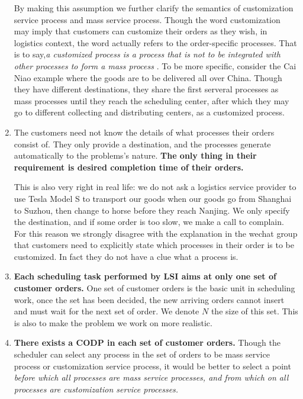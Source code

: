 \documentclass{llncs}
\begin{document}
\begin{enumerate}
    By making this assumption we further clarify the semantics of customization service process and mass service process. Though the word customization may imply that customers can customize their orders as they wish, in logistics context, the word actually refers to the order-specific processes. That is to say,\emph{a customized process is a process that is not to be integrated with other processes to form a mass process} . To be more specific, consider the Cai Niao example where the goods are to be delivered all over China. Though they have different destinations, they share the first serveral processes as mass processes until they reach the scheduling center, after which they may go to different collecting and distributing centers, as a customized process.
    \item The customers need not know the details of what processes their orders consist of. They only provide a destination, and the processes generate automatically to the problems's nature. \textbf{The only thing in their requirement is desired completion time of their orders.} 
    
    This is also very right in real life: we do not ask a logistics service provider to use Tesla Model S to transport our goods when our goods go from Shanghai to Suzhou, then change to horse before they reach Nanjing. We only specify the destination, and if some order is too slow, we make a call to complain. For this reason we strongly disagree with the explanation in the wechat group that customers need to explicitly state which processes in their order is to be customized. In fact they do not have a clue what a process is.
    \item \textbf{Each scheduling task performed by LSI aims at only one set of customer orders.} One set of customer orders is the basic unit in scheduling work, once the set has been decided, the new arriving orders cannot insert and must wait for the next set of order. We denote $N$ the size of this set. This is also to make the problem we work on more realistic. 
    \item \textbf{There exists a CODP in each set of customer orders.} Though the scheduler can select any process in the set of orders to be mass service process or customization service process, it would be better to select a point \emph{before which all processes are mass service processes, and from which on all processes are customization service processes.}
    

\end{enumerate}
\end{document}
